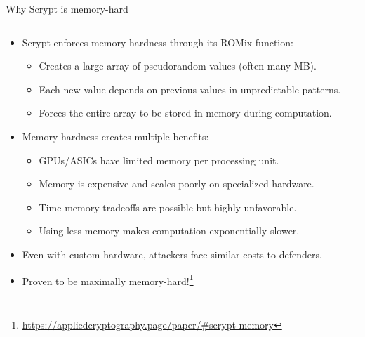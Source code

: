\documentclass[aspectratio=169, lualatex, handout]{beamer}
\begin{document}
\begin{frame}{Why Scrypt is memory-hard}
	\begin{columns}[c]
		\begin{column}{1\textwidth}
			\begin{itemize}[<+->]
				\item Scrypt enforces memory hardness through its ROMix function:
				      \begin{itemize}
					      \item Creates a large array of pseudorandom values (often many MB).
					      \item Each new value depends on previous values in unpredictable patterns.
					      \item Forces the entire array to be stored in memory during computation.
				      \end{itemize}
				\item Memory hardness creates multiple benefits:
				      \begin{itemize}
					      \item GPUs/ASICs have limited memory per processing unit.
					      \item Memory is expensive and scales poorly on specialized hardware.
					      \item Time-memory tradeoffs are possible but highly unfavorable.
					      \item Using less memory makes computation exponentially slower.
				      \end{itemize}
				\item Even with custom hardware, attackers face similar costs to defenders.
				\item Proven to be maximally memory-hard!\footnote{\url{https://appliedcryptography.page/paper/\#scrypt-memory}}
			\end{itemize}
		\end{column}
	\end{columns}
\end{frame}
\end{document}
